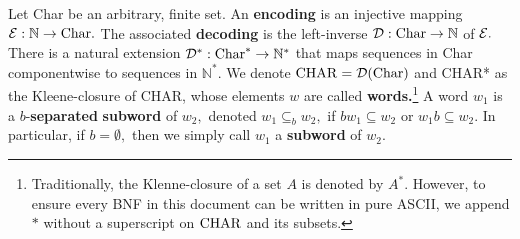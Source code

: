 Let Char be an arbitrary, finite set. An \textbf{encoding} is an injective mapping $\mathcal{E} : \mathbb{N} \to \textrm{Char}.$ The associated \textbf{decoding} is the left-inverse $\mathcal{D}: \mathrm{Char} \to \mathbb{N}$ of $\mathcal{E}.$ There is a natural extension $\mathcal{D}^{*}: \textrm{Char}^{*} \to \mathbb{N}^{*}$
that maps sequences in Char componentwise to sequences in $\mathbb{N}^{*}.$
We denote $\mathrm{CHAR} = \mathcal{D}(\textrm{Char})$ and CHAR* as the
Kleene-closure of CHAR, whose elements $w$ are called \textbf{words.}\footnote{Traditionally, the Klenne-closure of a set $A$ is denoted by $A^{*}.$ However, to ensure every BNF in this document
  can be written in pure ASCII, we append $*$ without a superscript on $\mathrm{CHAR}$ and its subsets.} A word $w_{1}$ is a $b$-\textbf{separated} \textbf{subword} of $w_{2},$ denoted $w_{1} \subseteq_{b} w_{2},$ if $bw_{1} \subseteq w_{2}$ or $w_{1}b \subseteq w_{2}.$ In particular, if $b = \emptyset,$ then we simply call $w_{1}$ a \textbf{subword} of $w_{2}.$

